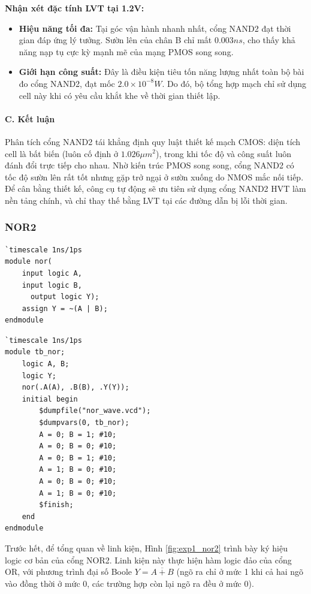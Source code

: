 \documentclass[12pt, a4paper, oneside]{article}
\begin{document}
\textbf{Nhận xét đặc tính LVT tại 1.2V:}
\begin{itemize}
    \item \textbf{Hiệu năng tối đa:} Tại góc vận hành nhanh nhất, cổng NAND2 đạt thời gian đáp ứng lý tưởng. Sườn lên của chân B chỉ mất $0.003ns$, cho thấy khả năng nạp tụ cực kỳ mạnh mẽ của mạng PMOS song song.
    \item \textbf{Giới hạn công suất:} Đây là điều kiện tiêu tốn năng lượng nhất toàn bộ bài đo cổng NAND2, đạt mốc $2.0 \times 10^{-8}W$. Do đó, bộ tổng hợp mạch chỉ sử dụng cell này khi có yêu cầu khắt khe về thời gian thiết lập.
\end{itemize}

\paragraph{C. Kết luận} 
Phân tích cổng NAND2 tái khẳng định quy luật thiết kế mạch CMOS: diện tích cell là bất biến (luôn cố định ở $1.026 \mu m^2$), trong khi tốc độ và công suất luôn đánh đổi trực tiếp cho nhau. Nhờ kiến trúc PMOS song song, cổng NAND2 có tốc độ sườn lên rất tốt nhưng gặp trở ngại ở sườn xuống do NMOS mắc nối tiếp. Để cân bằng thiết kế, công cụ tự động sẽ ưu tiên sử dụng cổng NAND2 HVT làm nền tảng chính, và chỉ thay thế bằng LVT tại các đường dẫn bị lỗi thời gian.
\newpage
\subsubsection{NOR2}
\begin{lstlisting}[style={prettyverilog}, caption={\texttt{code thiết kế cổng NOR}}]
`timescale 1ns/1ps
module nor(
    input logic A,
    input logic B,
      output logic Y);
    assign Y = ~(A | B);
endmodule
\end{lstlisting}
\begin{lstlisting}[style={prettyverilog}, caption={\texttt{code testbench cổng NOR}}]
`timescale 1ns/1ps
module tb_nor;
    logic A, B;
    logic Y;
    nor(.A(A), .B(B), .Y(Y));
    initial begin
        $dumpfile("nor_wave.vcd");
        $dumpvars(0, tb_nor);
        A = 0; B = 1; #10;
        A = 0; B = 0; #10;
        A = 0; B = 1; #10;
        A = 1; B = 0; #10;
        A = 0; B = 0; #10;
        A = 1; B = 0; #10;
        $finish;
    end
endmodule
\end{lstlisting}

Trước hết, để tổng quan về linh kiện, Hình \ref{fig:exp1_nor2} trình bày ký hiệu logic cơ bản của cổng NOR2. Linh kiện này thực hiện hàm logic đảo của cổng OR, với phương trình đại số Boole $Y = \overline{A + B}$ (ngõ ra chỉ ở mức 1 khi cả hai ngõ vào đồng thời ở mức 0, các trường hợp còn lại ngõ ra đều ở mức 0).
\end{document}
